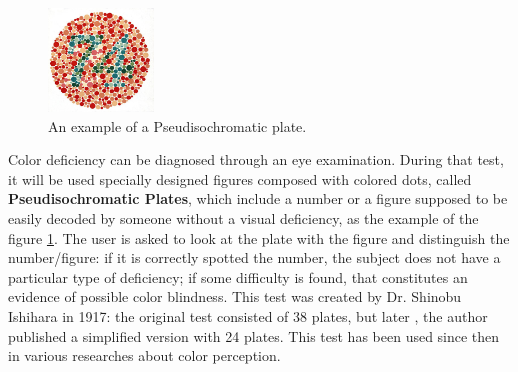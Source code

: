 %
\begin{figure}
	\centering
    \vspace{-\baselineskip}
    \includegraphics[width=0.25\textwidth]{images/background/IshiharaPlates.jpg}
    \caption[Pseudisochromatic Plate]{An example of a Pseudisochromatic plate.\protect\footnotemark{}}
    \label{fig:ishihara}
\end{figure}
%
Color deficiency can be diagnosed through an eye examination. During that test, it will be used
specially designed figures composed with colored dots, called \textbf{Pseudisochromatic Plates}, which
include a number or a figure supposed to be easily decoded by someone without a visual deficiency, as the example
of the figure \ref{fig:ishihara}. The user is asked to look at the plate with the figure and distinguish
the number/figure: if it is correctly spotted the number, the subject does not have a particular type of deficiency; if some difficulty is found, that constitutes an evidence of possible color blindness. This test was created by Dr. Shinobu Ishihara in 1917: the original test
consisted of 38 plates, but later \cite{Ishihara1972}, the author published a
simplified version with 24 plates. This test has been used since then in various researches about color perception.
%
